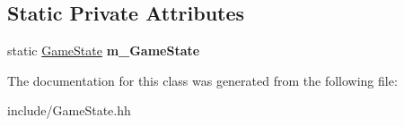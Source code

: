 \subsection*{Static Private Attributes}
\begin{DoxyCompactItemize}
\item 
\hypertarget{class_game_state_aad5c16af3bf1122b62e1ee769d47304d}{}static \hyperlink{class_game_state}{Game\+State} {\bfseries m\+\_\+\+Game\+State}\label{class_game_state_aad5c16af3bf1122b62e1ee769d47304d}

\end{DoxyCompactItemize}


The documentation for this class was generated from the following file\+:\begin{DoxyCompactItemize}
\item 
include/Game\+State.\+hh\end{DoxyCompactItemize}
